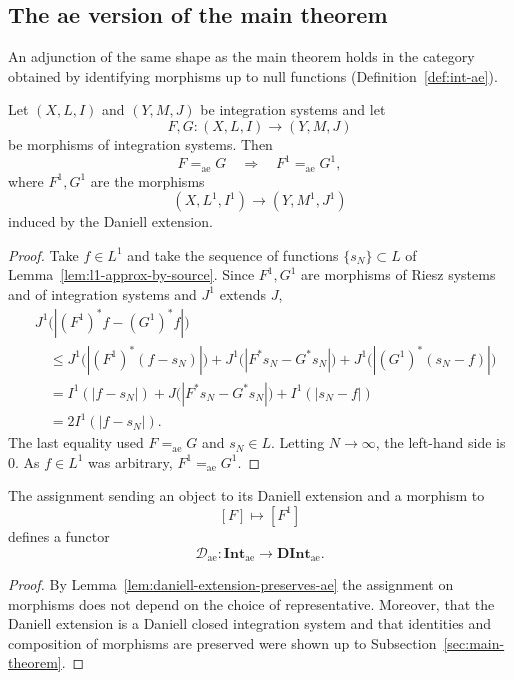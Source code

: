 \subsection{The ae version of the main theorem}\label{sec:main-theorem-ae}

An adjunction of the same shape as the main theorem holds in the category
obtained by identifying morphisms up to null functions
(Definition~\ref{def:int-ae}).

\begin{lemma}\label{lem:daniell-extension-preserves-ae}
  Let $(X,L,I)$ and $(Y,M,J)$ be integration systems and let
  \[
    F,G:(X,L,I)\to(Y,M,J)
  \]
  be morphisms of integration systems. Then
  \[
    F=_{\mathrm{ae}}G
    \quad\Longrightarrow\quad
    F^1=_{\mathrm{ae}}G^1 ,
  \]
  where $F^1,G^1$ are the morphisms
  \[
    (X,L^1,I^1)\to(Y,M^1,J^1)
  \]
  induced by the Daniell extension.
\end{lemma}
\begin{proof}
  Take $f\in L^1$ and take the sequence of functions $\{s_N\}\subset L$ of
  Lemma~\ref{lem:l1-approx-by-source}.
  Since $F^1,G^1$ are morphisms of Riesz systems and of integration systems and
  $J^1$ extends $J$,
  \[
    \begin{aligned}
      &J^1\bigl(|(F^1)^*f-(G^1)^*f|\bigr)\\
      &\quad\le
      J^1\bigl(|(F^1)^*(f-s_N)|\bigr)
      +J^1\bigl(|F^*s_N-G^*s_N|\bigr)
      +J^1\bigl(|(G^1)^*(s_N-f)|\bigr)\\
      &\quad=
      I^1(|f-s_N|)
      +J\bigl(|F^*s_N-G^*s_N|\bigr)
      +I^1(|s_N-f|)\\
      &\quad=2I^1(|f-s_N|).
    \end{aligned}
  \]
  The last equality used $F=_{\mathrm{ae}}G$ and $s_N\in L$.
  Letting $N\to\infty$, the left-hand side is $0$. As $f\in L^1$ was arbitrary,
  $F^1=_{\mathrm{ae}}G^1$.
\end{proof}

\begin{corollary}\label{cor:daniell-extension-ae-functor}
  The assignment sending an object to its Daniell extension and a morphism to
  \[
    [F]\longmapsto[F^1]
  \]
  defines a functor
  \[
    \mathcal{D}_{\mathrm{ae}}:
    \mathbf{Int}_{\mathrm{ae}}
    \to
    \mathbf{DInt}_{\mathrm{ae}} .
  \]
\end{corollary}
\begin{proof}
  By Lemma~\ref{lem:daniell-extension-preserves-ae} the assignment on morphisms
  does not depend on the choice of representative.
  Moreover, that the Daniell extension is a Daniell closed integration system
  and that identities and composition of morphisms are preserved were shown up
  to Subsection~\ref{sec:main-theorem}.
\end{proof}

